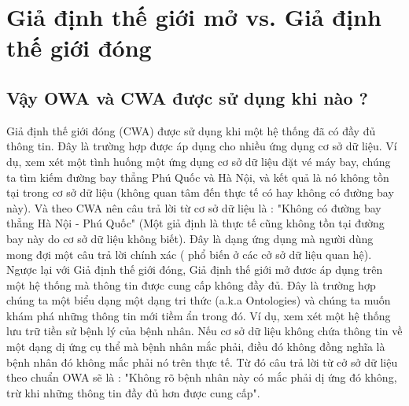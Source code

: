 \chapter{Giả định thế giới mở vs. Giả định thế giới đóng}
\section{Vậy OWA và CWA được sử dụng khi nào ?}
Giả định thế giới đóng (CWA) được sử dụng khi một hệ thống đã có đầy đủ thông tin. Đây là trường hợp được áp dụng cho nhiều ứng dụng cơ sở dữ liệu. Ví dụ, xem xét một tình huống một ứng dụng cơ sở dữ liệu đặt vé máy bay, chúng ta tìm kiếm đường bay thẳng Phú Quốc và Hà Nội, và kết quả là nó không tồn tại trong cơ sở dữ liệu (không quan tâm đến thực tế có hay không có đường bay này). Và theo CWA nên câu trả lời từ cơ sở dữ liệu là : "Không có đường bay thẳng Hà Nội - Phú Quốc" (Một giả định là thực tế cũng không tồn tại đường bay này do cơ sở dữ liệu không biết). Đây là dạng ứng dụng mà người dùng mong đợi một câu trả lời chính xác ( phổ biến ở các cở sở dữ liệu quan hệ).
\\Ngược lại với Giả định thế giới đóng, Giả định thế giới mở đươc áp dụng trên một hệ thống mà thông tin được cung cấp không đầy đủ. Đây là trường hợp chúng ta một biểu dạng một dạng tri thức (a.k.a Ontologies) và chúng ta muốn khám phá những thông tin mới tiềm ẩn trong đó. Ví dụ, xem xét một hệ thống lưu trữ tiền sử bệnh lý của bệnh nhân. Nếu cơ sở dữ liệu không chứa thông tin về một dạng dị ứng cụ thể mà bệnh nhân mắc phải, điều đó không đồng nghĩa là bệnh nhân đó không mắc phải nó trên thực tế. Từ đó câu trả lời từ cở sở dữ liệu theo chuẩn OWA sẽ là : "Không rõ bệnh nhân này có mắc phải dị ứng đó không, trừ khi những thông tin đầy đủ hơn được cung cấp".
